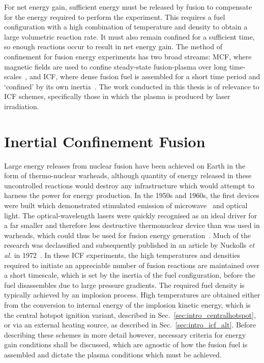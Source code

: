 For net energy gain, sufficient energy must be released by fusion to compensate for the energy required to perform the experiment.
This requires a fuel configuration with a high combination of temperature and density to obtain a large volumetric reaction rate.
It must also remain confined for a sufficient time, so enough reactions occur to result in net energy gain.
The method of confinement for fusion energy experiments has two broad streams: \ac{MCF}, where magnetic fields are used to confine steady-state fusion-plasma over long time-scales~\cite{rebut_joint_2018}, and \ac{ICF}, where dense fusion fuel is assembled for a short time period and `confined' by its own inertia~\cite{nuckolls_laser_1972}.
The work conducted in this thesis is of relevance to \ac{ICF} schemes, specifically those in which the plasma is produced by laser irradiation.

\section{Inertial Confinement Fusion}%
\label{sec:intro_ICF}

Large energy releases from nuclear fusion have been achieved on Earth in the form of thermo-nuclear warheads, although quantity of energy released in these uncontrolled reactions would destroy any infrastructure which would attempt to harness the power for energy production.
In the 1950s and 1960s, the first devices were built which demonstrated stimulated emission of microwave~\cite{schawlow_infrared_1958} and optical~\cite{maiman_stimulated_1960} light.
The optical-wavelength lasers were quickly recognised as an ideal driver for a far smaller and therefore less destructive thermonuclear device than was used in warheads, which could thus be used for fusion energy generation~\cite{nuckolls_early_1998}.
Much of the research was declassified and subsequently published in an article by Nuckolls \textit{et al.} in 1972~\cite{nuckolls_laser_1972}.
In these \ac{ICF} experiments, the high temperatures and densities required to initiate an appreciable number of fusion reactions are maintained over a short timescale, which is set by the inertia of the fuel configuration, before the fuel disassembles due to large pressure gradients.
The required fuel density is typically achieved by an implosion process.
High temperatures are obtained either from the conversion to internal energy of the implosion kinetic energy, which is the central hotspot ignition variant, described in Sec.~\ref{sec:intro_centralhotspot}, or via an external heating source, as described in Sec.~\ref{sec:intro_icf_alt}.
Before describing these schemes in more detail however, necessary criteria for energy gain conditions shall be discussed, which are agnostic of how the fusion fuel is assembled and dictate the plasma conditions which must be achieved.

